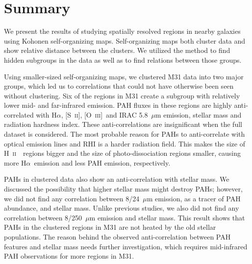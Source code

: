 \documentclass[useAMS,usenatbib]{mn2e}
\newcommand \halpha    {H$\alpha $}
\newcommand \sii {[S~\textsc{ii}]}
\newcommand \oiii {[O~\textsc{iii}]}
\newcommand \hii {H~\textsc{ii}\ }
\begin{document}
\section{Summary}
\label{sec: summary}

We present the results of studying spatially resolved regions in nearby galaxies using Kohonen self-organizing maps.
Self-organizing maps both cluster data and show relative distance between the clusters. 
We utilized the method to find hidden subgroups in the data as well as to find relations between those groups.

Using smaller-sized self-organizing maps, we clustered M31 data into two major groups, which led us to correlations that could not have otherwise been seen without clustering.
Six of the regions in M31 create a subgroup with relatively lower mid- and far-infrared emission.
PAH fluxes in these regions are highly anti-correlated with \halpha, \sii, \oiii~and IRAC 5.8~$\mu$m emission, stellar mass and radiation hardness index.
These anti-correlations are insignificant when the full dataset is considered.
The most probable reason for PAHs to anti-correlate with optical emission lines and RHI is a harder radiation field.
This makes the size of \hii~regions bigger and the size of photo-dissociation regions smaller, causing more \halpha~emission and less PAH emission, respectively.

PAHs in clustered data also show an anti-correlation with stellar mass.
We discussed the possibility that higher stellar mass might destroy PAHs;
however, we did not find any correlation between 8/24~$\mu$m emission, as a tracer of PAH abundance, and stellar mass.
Unlike previous studies, we also did not find any correlation between 8/250~$\mu$m emission and stellar mass. 
This result shows that PAHs in the clustered regions in M31 are not heated by the old stellar populations.
The reason behind the observed anti-correlation between PAH features and stellar mass needs further investigation, which requires mid-infrared PAH observations for more regions in M31. 
\end{document}
